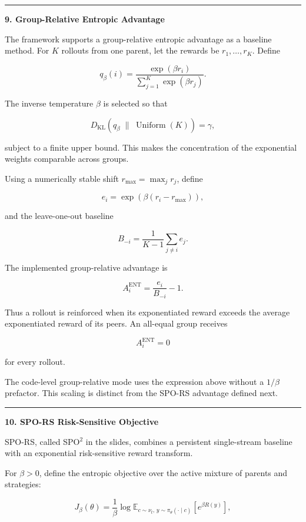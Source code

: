 \documentclass[
]{article}
\begin{document}
\begin{center}\rule{0.5\linewidth}{0.5pt}\end{center}

\textbf{9. Group-Relative Entropic Advantage}

The framework supports a group-relative entropic advantage as a baseline
method. For \(K\) rollouts from one parent, let the rewards be
\(r_1,\ldots,r_K\). Define

\[
q_\beta(i)
=
\frac{\exp(\beta r_i)}
{\sum_{j=1}^{K}\exp(\beta r_j)}.
\]

The inverse temperature \(\beta\) is selected so that

\[
D_{\mathrm{KL}}
\left(
q_\beta\;\|\;\operatorname{Uniform}(K)
\right)
=
\gamma,
\]

subject to a finite upper bound. This makes the concentration of the
exponential weights comparable across groups.

Using a numerically stable shift \(r_{\max}=\max_j r_j\), define

\[
e_i=\exp\left(\beta(r_i-r_{\max})\right),
\]

and the leave-one-out baseline

\[
B_{-i}
=
\frac{1}{K-1}
\sum_{j\ne i}e_j.
\]

The implemented group-relative advantage is

\[
A_i^{\mathrm{ENT}}
=
\frac{e_i}{B_{-i}}-1.
\]

Thus a rollout is reinforced when its exponentiated reward exceeds the
average exponentiated reward of its peers. An all-equal group receives

\[
A_i^{\mathrm{ENT}}=0
\]

for every rollout.

The code-level group-relative mode uses the expression above without a
\(1/\beta\) prefactor. This scaling is distinct from the SPO-RS
advantage defined next.

\begin{center}\rule{0.5\linewidth}{0.5pt}\end{center}

\textbf{10. SPO-RS Risk-Sensitive Objective}

SPO-RS, called SPO\(^2\) in the slides, combines a persistent
single-stream baseline with an exponential risk-sensitive reward
transform.

For \(\beta>0\), define the entropic objective over the active mixture
of parents and strategies:

\[
J_\beta(\theta)
=
\frac{1}{\beta}
\log
\mathbb{E}_{c\sim\nu_t,\,
y\sim\pi_\theta(\cdot\mid c)}
\left[
e^{\beta R(y)}
\right],
\]
\end{document}
